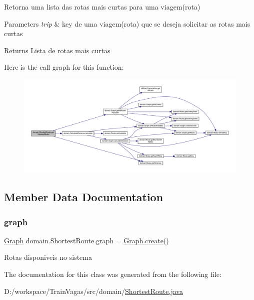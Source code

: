 Retorna uma lista das rotas mais curtas para uma viagem(rota)


\begin{DoxyParams}{Parameters}
{\em trip} & key de uma viagem(rota) que se deseja solicitar as rotas mais curtas \\
\hline
\end{DoxyParams}
\begin{DoxyReturn}{Returns}
Lista de rotas mais curtas 
\end{DoxyReturn}
Here is the call graph for this function\+:\nopagebreak
\begin{figure}[H]
\begin{center}
\leavevmode
\includegraphics[width=350pt]{classdomain_1_1_shortest_route_a6378b797c933b6ebb2a48447761e02f7_cgraph}
\end{center}
\end{figure}


\subsection{Member Data Documentation}
\mbox{\label{classdomain_1_1_shortest_route_a3cc017eeb29651f61b8eac7f0e23c682}} 
\subsubsection{\texorpdfstring{graph}{graph}}
{\footnotesize\ttfamily \hyperlink{classdomain_1_1_graph}{Graph} domain.\+Shortest\+Route.\+graph = \hyperlink{classdomain_1_1_graph_a57ce4efd344c059a565f4bb104fdee64}{Graph.\+create}()\hspace{0.3cm}{\ttfamily [package]}}

Rotas disponiveis no sistema 

The documentation for this class was generated from the following file\+:\begin{DoxyCompactItemize}
\item 
D\+:/workspace/\+Train\+Vagas/src/domain/\hyperlink{_shortest_route_8java}{Shortest\+Route.\+java}\end{DoxyCompactItemize}
